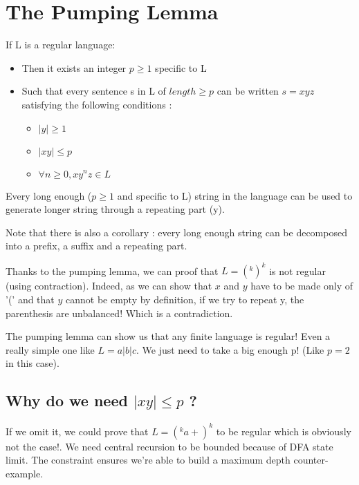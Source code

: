 \section{The Pumping Lemma}
    \theoremstyle{definition}
    \begin{definition}
        If L is a regular language:
        \begin{itemize}
            \item Then it exists an integer $p\geq 1$ specific to L
            \item Such that every sentence s in L of $length \geq p$ can be
            written $s = x y z$ satisfying the following conditions :
            \begin{itemize}
                \item $|y| \geq 1$
                \item $| x y| \leq p$
                \item $\forall n \geq 0, x y^n z \in L$
            \end{itemize}
        \end{itemize}

        Every long enough ($p\geq 1$ and specific to L) string in the language
        can be used to generate longer string through a repeating part (y).

        Note that there is also a corollary : every long enough string can be
        decomposed into a prefix, a suffix and a repeating part.
    \end{definition}

    Thanks to the pumping lemma, we can proof that $L = (^k )^k$ is not regular
    (using contraction). Indeed, as we can show that $x$ and $y$ have to be made
    only of '(' and that $y$ cannot be empty by definition, if we try to repeat
    y, the parenthesis are unbalanced! Which is a contradiction.

    The pumping lemma can show us that any finite language is regular! Even a
    really simple one like $L = a | b | c$. We just need to take a big enough p!
    (Like $p=2$ in this case).

    \subsection{Why do we need $|x y | \leq p$ ?}
        If we omit it, we could prove that $L = (^k a+ )^k$ to be regular which
        is obviously not the case!. We need central recursion to be bounded
        because of DFA state limit. The constraint ensures we're able to build a
        maximum depth counter-example.
